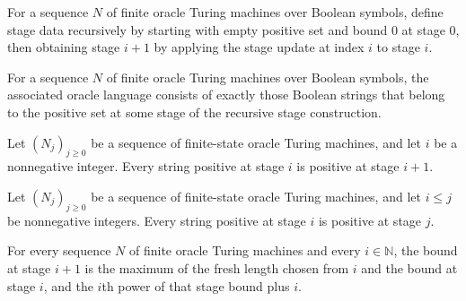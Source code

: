 \begin{definition}
\label{Complexity.stage}
\leanok
{}
For a sequence $N$ of finite oracle Turing machines over Boolean symbols, define stage
data recursively by starting with empty positive set and bound $0$ at stage $0$, then
obtaining stage $i+1$ by applying the stage update at index $i$ to stage $i$.
\end{definition}

\begin{definition}
\label{Complexity.bgsOracle}
\leanok
{}
For a sequence $N$ of finite oracle Turing machines over Boolean symbols, the associated
oracle language consists of exactly those Boolean strings that belong to the positive
set at some stage of the recursive stage construction.
\end{definition}

\begin{theorem}
\label{Complexity.stage_pos_succ}
\leanok
{}
Let $(N_j)_{j\ge0}$ be a sequence of finite-state oracle Turing machines, and let $i$ be
a nonnegative integer. Every string positive at stage $i$ is positive at stage $i+1$.
\end{theorem}

\begin{theorem}
\label{Complexity.stage_pos_mono}
\leanok
{}
Let $(N_j)_{j\ge0}$ be a sequence of finite-state oracle Turing machines, and let $i\le
j$ be nonnegative integers. Every string positive at stage $i$ is positive at stage $j$.
\end{theorem}

\begin{theorem}
\label{Complexity.stage_bound_succ}
\leanok
{}
For every sequence $N$ of finite oracle Turing machines and every $i\in\mathbb{N}$, the
bound at stage $i+1$ is the maximum of the fresh length chosen from $i$ and the bound at
stage $i$, and the $i$th power of that stage bound plus $i$.
\end{theorem}


